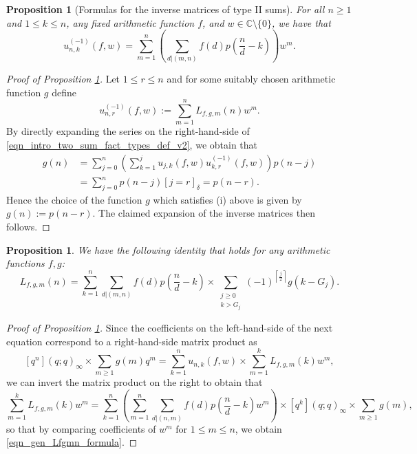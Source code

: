 \documentclass[12pt,reqno,a4letter]{article}
\numberwithin{figure}{section}
\numberwithin{table}{section}
\numberwithin{equation}{section}
\newcommand{\Iverson}[1]{\ensuremath{\left[#1\right]_{\delta}}}
\newcommand{\ceiling}[1]{\left\lceil #1 \right\rceil}
\theoremstyle{plain}
\newtheorem{prop}[theorem]{Proposition}
\numberwithin{theorem}{section}
\theoremstyle{definition}
\begin{document}
\begin{prop}[Formulas for the inverse matrices of type II sums] 
\label{prop_unk_inverse_matrix} 
For all $n \geq 1$ and $1 \leq k \leq n$, any fixed arithmetic function $f$, 
and $w \in \mathbb{C} \setminus \{0\}$, we have that 
\[
u_{n,k}^{(-1)}(f, w) = \sum_{m=1}^n \left(\sum_{d|(m,n)} f(d) p\left(\frac{n}{d}-k\right)\right) w^m. 
\]
\end{prop} 
\begin{proof}[Proof of Proposition \ref{prop_unk_inverse_matrix}]
Let $1 \leq r \leq n$ and for some suitably chosen arithmetic function $g$ define 
\[
\tag{i} 
u_{n,r}^{(-1)}(f, w) := \sum_{m=1}^n L_{f,g,m}(n) w^m. 
\]
By directly expanding the series on the right-hand-side of 
\eqref{eqn_intro_two_sum_fact_types_def_v2}, we obtain that 
\begin{align*} 
g(n) & = \sum_{j=0}^n \left( 
     \sum_{k=1}^j u_{j,k}(f, w) u_{k,r}^{(-1)}(f, w)\right) p(n-j) \\ 
     & = \sum_{j=0}^n p(n-j) \Iverson{j = r} 
     = p(n-r). 
\end{align*} 
Hence the choice of the function $g$ which satisfies (i) above is given by 
$g(n) := p(n-r)$. The claimed expansion of the inverse matrices then follows. 
\end{proof} 


\begin{prop}
\label{prop_exact_exp_of_Lfgmn} 
We have the following identity that holds for any arithmetic functions $f,g$: 
\begin{equation} 
\label{eqn_gen_Lfgmn_formula} 
L_{f,g,m}(n) = \sum_{k=1}^n \sum_{d|(m,n)} f(d) p\left(\frac{n}{d}-k\right) \times 
     \sum_{\substack{j \geq 0 \\ k > G_j}} (-1)^{\ceiling{\frac{j}{2}}} 
     g\left(k-G_j\right).
\end{equation} 
\end{prop}
\begin{proof}[Proof of Proposition \ref{prop_exact_exp_of_Lfgmn}]
Since the coefficients on the left-hand-side of the next equation correspond to a 
right-hand-side matrix product as 
\[
[q^n] (q; q)_{\infty} \times \sum_{m \geq 1} g(m) q^m = 
     \sum_{k=1}^n u_{n,k}(f, w) \times \sum_{m=1}^k L_{f,g,m}(k) w^m, 
\] 
we can invert the matrix product on the right to obtain that 
\[
\sum_{m=1}^k L_{f,g,m}(k) w^m = \sum_{k=1}^{n} \left(\sum_{m=1}^n \sum_{d|(n,m)} 
     f(d) p\left(\frac{n}{d}-k\right) w^m\right) \times 
     [q^k] (q; q)_{\infty} \times \sum_{m \geq 1} g(m), 
\]
so that by comparing coefficients of $w^m$ for $1 \leq m \leq n$, we obtain 
\eqref{eqn_gen_Lfgmn_formula}. 
\end{proof} 
\end{document}
